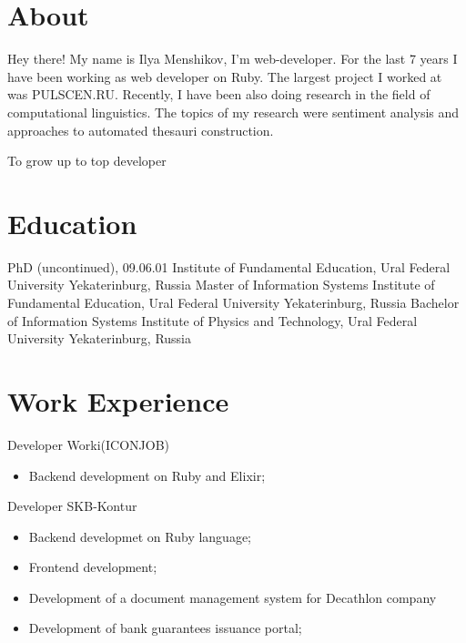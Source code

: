 \documentclass[11pt,a4paper]{moderncv}
\begin{document}
\maketitle

\section{About}
 {
  Hey there! My name is Ilya Menshikov, I'm web-developer.
}
\cvitem{} {
  For the last 7 years I have been working as web developer on Ruby. The largest project I worked at was PULSCEN.RU.
}
\cvitem{} {
  Recently, I have been also doing research in the field of computational linguistics. The topics of my research were sentiment analysis and approaches to automated thesauri construction.
}

 {
  To grow up to top developer
}


\section{Education}

  {PhD (uncontinued), 09.06.01}
  {Institute of Fundamental Education, Ural Federal University}
  {Yekaterinburg, Russia}
{}{}
  {Master of Information Systems}
  {Institute of Fundamental Education, Ural Federal University}
  {Yekaterinburg, Russia}
{}{}
  {Bachelor of Information Systems}
  {Institute of Physics and Technology, Ural Federal University}
  {Yekaterinburg, Russia}
{}{}

\section{Work Experience}

  {Developer}{}
  {Worki(ICONJOB)}
  {}
{
\begin{itemize}
  \item Backend development on Ruby and Elixir;
\end{itemize}
}

  {Developer}{}
  {SKB-Kontur}
  {}
{
\begin{itemize}
  \item Backend developmet on Ruby language;
  \item Frontend development;
  \item Development of a document management system for Decathlon company
  \item Development of bank guarantees issuance portal;
\end{itemize}
}
\end{document}
